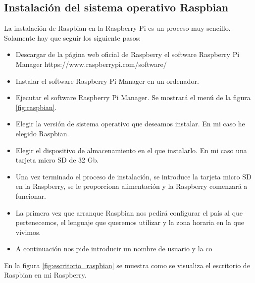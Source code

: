     \subsection{Instalación del sistema operativo Raspbian}
    La instalación de Raspbian en la Raspberry Pi es un proceso muy sencillo. Solamente hay que seguir los siguiente pasos:    
        \begin{itemize}
            \item Descargar de la página web oficial de Raspberry el software Raspberry Pi Manager
            https://www.raspberrypi.com/software/
            \item Instalar el software Raspberry Pi Manager en un ordenador.
            \item Ejecutar el software Raspberry Pi Manager. Se mostrará el menú de la figura \ref{fig:raspbian}.
            \item Elegir la versión de sistema operativo que deseamos instalar. En mi caso he elegido Raspbian.
            \item Elegir el dispositivo de almacenamiento en el que instalarlo. En mi caso una tarjeta micro SD de 32 Gb.
            \item Una vez terminado el proceso de instalación, se introduce la tarjeta micro SD en la Raspberry, se le proporciona alimentación y la Raspberry comenzará a funcionar. 
            \item La primera vez que arranque Raspbian nos pedirá configurar el país al que pertenecemos, el lenguaje que queremos utilizar y la zona horaria en la que vivimos.
            \item A continuación nos pide introducir un nombre de usuario y la co
        \end{itemize}
        En la figura \ref{fig:escritorio_raspbian} se muestra como se visualiza el escritorio de Raspbian en mi Raspberry.


